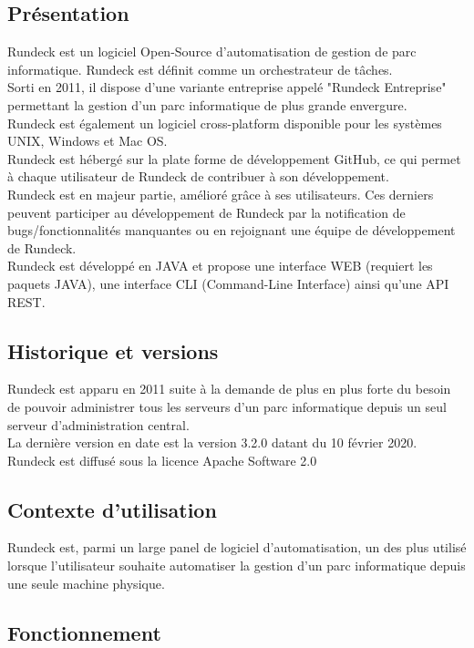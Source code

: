 \documentclass[12pt]{article}
\begin{document}
\subsection{Présentation}

Rundeck est un logiciel Open-Source d'automatisation de gestion de parc informatique. Rundeck est définit comme un orchestrateur de tâches. 
\\
Sorti en 2011, il dispose d'une variante entreprise appelé "Rundeck Entreprise" permettant la gestion d'un parc informatique de plus grande envergure. 
\\
Rundeck est également un logiciel cross-platform disponible pour les systèmes UNIX, Windows et Mac OS. 
\\
Rundeck est hébergé sur la plate forme de développement GitHub, ce qui permet à chaque utilisateur de Rundeck de contribuer à son développement. 
\\
Rundeck est en majeur partie, amélioré grâce à ses utilisateurs. Ces derniers peuvent participer au développement de Rundeck par la notification de bugs/fonctionnalités manquantes ou en rejoignant une équipe de développement de Rundeck. 
\\
Rundeck est développé en JAVA et propose une interface WEB (requiert les paquets JAVA), une interface CLI (Command-Line Interface) ainsi qu'une API REST.

\subsection{Historique et versions}

Rundeck est apparu en 2011 suite à la demande de plus en plus forte du besoin de pouvoir administrer tous les serveurs d'un parc informatique depuis un seul serveur d'administration central.
\\
La dernière version en date est la version 3.2.0 datant du 10 février 2020.
\\
Rundeck est diffusé sous la licence Apache Software 2.0

\subsection{Contexte d'utilisation}

Rundeck est, parmi un large panel de logiciel d'automatisation, un des plus utilisé lorsque l'utilisateur souhaite automatiser la gestion d'un parc informatique depuis une seule machine physique.

\subsection{Fonctionnement}
\end{document}
